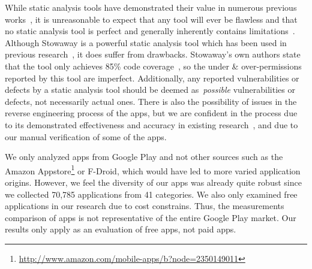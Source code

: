 \documentclass{llncs}
\begin{document}
While static analysis tools have demonstrated their value in numerous previous works~\cite{Felt:2011:APD:2046707.2046779, Pearce:2012:APS:2414456.2414498}, it is unreasonable to expect that any tool will ever be flawless and that no static analysis tool is perfect and generally inherently contains limitations~\cite{chess2004static}. Although Stowaway is a powerful static analysis tool which has been used in previous research~\cite{Felt:2011:APD:2046707.2046779, Pearce:2012:APS:2414456.2414498}, it does suffer from drawbacks. Stowaway's own authors state that the tool only achieves 85\% code coverage~\cite{Felt:2011:APD:2046707.2046779}, so the under \& over-permissions reported by this tool are imperfect. Additionally, any reported vulnerabilities or defects by a static analysis tool should be deemed as~\emph{possible} vulnerabilities or defects, not necessarily actual ones. There is also the possibility of issues in the reverse engineering process of the apps, but we are confident in the process due to its demonstrated effectiveness and accuracy in existing research~\cite{krutz2015FDroid, Lee_2013}, and due to our manual verification of some of the apps.





We only analyzed apps from Google Play and not other sources such as the Amazon Appstore\footnote{\url{http://www.amazon.com/mobile-apps/b?node=2350149011}} or F-Droid, which would have led to more varied application origins. However, we feel the diversity of our apps was already quite robust since we collected 70,785  applications from 41 categories. We also only examined free applications in our research due to cost constrains. Thus, the measurements comparison of apps is not representative of the entire Google Play market. Our results only apply as an evaluation of free apps, not paid apps.
\end{document}
